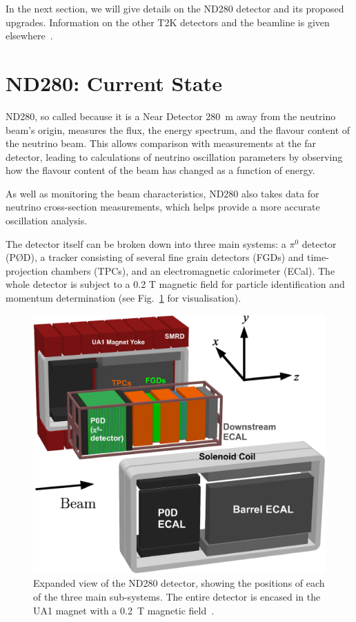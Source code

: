 \documentclass[aps,pra,12pt,notitlepage,tightenlines]{revtex4-1}
\begin{document}
In the next section, we will give details on the ND280 detector and its proposed upgrades. Information on the other T2K detectors and the beamline is given elsewhere~\cite{ABE2011106}.

\section{ND280: Current State}
ND280, so called because it is a Near Detector 280~m away from the neutrino beam's origin, measures the flux, the energy spectrum, and the flavour content of the neutrino beam. This allows comparison with measurements at the far detector, leading to calculations of neutrino oscillation parameters by observing how the flavour content of the beam has changed as a function of energy. 

As well as monitoring the beam characteristics, ND280 also takes data for neutrino cross-section measurements, which helps provide a more accurate oscillation analysis. 

The detector itself can be broken down into three main systems: a $\pi^0$ detector (P\O D), a tracker consisting of several fine grain detectors (FGDs) and time-projection chambers (TPCs), and an electromagnetic calorimeter (ECal). The whole detector is subject to a 0.2 T magnetic field for particle identification and momentum determination (see Fig.\ \ref{fig:ND} for visualisation).
\begin{figure}
 \includegraphics[scale=1]{ND280.png}
 \caption{Expanded view of the ND280 detector, showing the positions of each of the three main sub-systems. The entire detector is encased in the UA1 magnet with a 0.2~T magnetic field~\cite{ABE2011106}.}
 \label{fig:ND}
\end{figure} 
\end{document}
